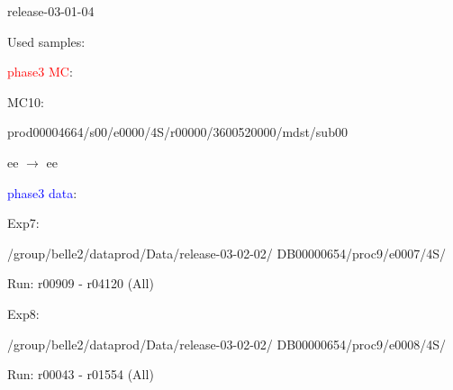 \documentclass[8pt]{beamer}
\begin{document}
{
	\begin{frame}[noframenumbering]
		\sectionpage
		\begin{itemize}
			\normalsize{
				
				\item release-03-01-04
				\item Used samples:
				\begin{itemize}
					\normalsize{
						
						\item[] \textcolor{red}{phase3 MC}: 
						
						\item MC10: 
						
						\begin{itemize}
							\normalsize{
								\item[] prod00004664/s00/e0000/4S/r00000/3600520000/mdst/sub00
								
								ee $\rightarrow$ ee
							}
						\end{itemize}
						
						\item[] \textcolor{blue}{phase3 data}: 
						\begin{itemize}
							\normalsize{
								\item Exp7:
								
								/group/belle2/dataprod/Data/release-03-02-02/ DB00000654/proc9/e0007/4S/
								
								Run: r00909 - r04120 (All)
								
								\item Exp8:
								
								/group/belle2/dataprod/Data/release-03-02-02/ DB00000654/proc9/e0008/4S/
								
								Run: r00043 - r01554 (All)
								
							}
						\end{itemize}
						
					}
				\end{itemize}
			}
		\end{itemize}
		
		
	\end{frame}
	
}
\end{document}
